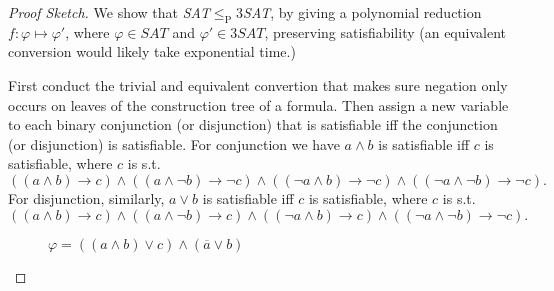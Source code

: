 \begin{proof}[Proof Sketch]
  We show that \textit{SAT}$\leq_{\mathrm{P}}$3\textit{SAT}, by giving a polynomial reduction $f:\varphi\mapsto \varphi'$, where $\varphi\in \textit{SAT}$ and $\varphi'\in 3\textit{SAT}$, preserving satisfiability (an equivalent conversion would likely take exponential time.)

  First conduct the trivial and equivalent convertion that makes sure negation only occurs on leaves of the construction tree of a formula. Then assign a new variable to each binary conjunction (or disjunction) that is satisfiable iff the conjunction (or disjunction) is satisfiable. For conjunction we have $a\wedge b$ is satisfiable iff $c$ is satisfiable, where $c$ is s.t.
  \[
    ((a\wedge b)\to c)\wedge((a\wedge \neg b)\to \neg c)\wedge ((\neg a\wedge b)\to \neg c)\wedge ((\neg a\wedge \neg b)\to \neg c).
  \]
  For disjunction, similarly, $a\vee b$ is satisfiable iff $c$ is satisfiable, where $c$ is s.t.
  \[
    ((a\wedge b)\to c)\wedge((a\wedge \neg b)\to c)\wedge ((\neg a\wedge b)\to c)\wedge ((\neg a\wedge \neg b)\to \neg c).
  \]
  \begin{figure}[H]
    \centering
    \caption{$\varphi=((a\wedge b)\vee c)\wedge(\overline{a}\vee b)$}
  \end{figure}


\end{proof}
